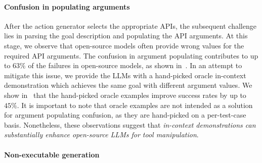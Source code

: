 \paragraph{Confusion in populating arguments}
% 
After the action generator selects the appropriate APIs, the subsequent challenge lies in parsing the goal description and populating the API arguments. At this stage, we observe that open-source models often provide wrong values for the required API arguments. 
The confusion in argument populating contributes to up to $63\%$ of the failures in open-source models, as shown in~. In an attempt to mitigate this issue, we provide the LLMs with a hand-picked oracle in-context demonstration which achieves the same goal with different argument values. We show in~ that the hand-picked oracle examples improve success rates by up to $45\%$. It is important to note that oracle examples are not intended as a solution for argument populating confusion, as they are hand-picked on a per-test-case basis. Nonetheless, these observations suggest that \emph{in-context demonstrations can substantially enhance open-source LLMs for tool manipulation}.


% 
\paragraph{Non-executable generation}

